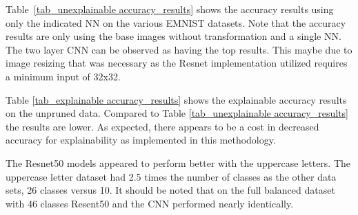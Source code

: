 \documentclass[conference]{IEEEtran}
\begin{document}
Table~\ref{tab_unexplainable accuracy_results} shows the accuracy results using
only the indicated NN on the various EMNIST datasets.  Note that the accuracy
results are only using the base images without transformation and a single NN.
The two layer CNN can be observed as having the top results.  This maybe due to
image resizing that was necessary as the Resnet implementation utilized requires
a minimum input of 32x32.  

\begin{table}
    \centering
    \caption{\label{tab_unexplainable accuracy_results}Unexplainable accuracy results on various balanced EMNIST data sets with differing NN models}
\end{table}

Table \ref{tab_explainable accuracy_results} shows the explainable accuracy
results on the unpruned data. Compared to Table \ref{tab_unexplainable
accuracy_results} the results are lower.  As expected, there appears to be a
cost in decreased accuracy for explainability as implemented in this
methodology. %

The Resnet50 models appeared to perform better with the uppercase letters.  The
uppercase letter dataset had 2.5 times the number of classes as the other data
sets, 26 classes versus 10.  It should be noted that on the full balanced
dataset with 46 classes Resent50 and the CNN performed nearly identically. 
\end{document}
